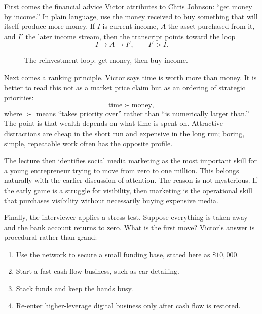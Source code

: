 First comes the financial advice Victor attributes to Chris Johnson: ``get money by income.'' In plain language, use the money received to buy something that will itself produce more money. If \(I\) is current income, \(A\) the asset purchased from it, and \(I'\) the later income stream, then the transcript points toward the loop
\begin{equation}
I \to A \to I', \qquad I' > I.
\end{equation}

\begin{figure}
\centering
{}
\caption{The reinvestment loop: get money, then buy income.}
\end{figure}

Next comes a ranking principle. Victor says time is worth more than money. It is better to read this not as a market price claim but as an ordering of strategic priorities:
\begin{equation}
\text{time} \succ \text{money},
\end{equation}
where \(\succ\) means ``takes priority over'' rather than ``is numerically larger than.'' The point is that wealth depends on what time is spent on. Attractive distractions are cheap in the short run and expensive in the long run; boring, simple, repeatable work often has the opposite profile.

The lecture then identifies social media marketing as the most important skill for a young entrepreneur trying to move from zero to one million. This belongs naturally with the earlier discussion of attention. The reason is not mysterious. If the early game is a struggle for visibility, then marketing is the operational skill that purchases visibility without necessarily buying expensive media.

Finally, the interviewer applies a stress test. Suppose everything is taken away and the bank account returns to zero. What is the first move? Victor's answer is procedural rather than grand:
\begin{enumerate}
\item Use the network to secure a small funding base, stated here as \(\$10{,}000\).
\item Start a fast cash-flow business, such as car detailing.
\item Stack funds and keep the hands busy.
\item Re-enter higher-leverage digital business only after cash flow is restored.
\end{enumerate}


